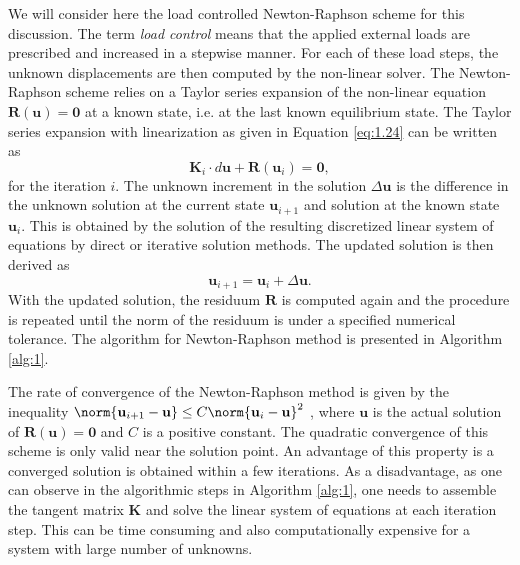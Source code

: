 \documentclass[11pt,a4paper,final]{article}
\begin{document}
We will consider here the load controlled Newton-Raphson scheme for this discussion. The term \textit{load control} means that the applied external loads are prescribed and increased in a stepwise manner. For each of these load steps, the unknown displacements are then computed by the non-linear solver. The Newton-Raphson scheme relies on a Taylor series expansion of the non-linear equation $\mathbf{R} (\mathbf{u}) = \bm{0}$ at a known state, i.e. at the last known equilibrium state. The Taylor series expansion with linearization as given in Equation \eqref{eq:1.24} can be written as 
\begin{equation}
\mathbf{K}_i \cdot d\mathbf{u} + \mathbf{R}(\mathbf{u}_i) = \bm{0},
\end{equation}
for the iteration $i$. The unknown increment in the solution $\Delta\mathbf{u}$ is the difference in the unknown solution at the current state $\mathbf{u}_{i+1}$ and solution at the known state $\mathbf{u}_i$. This is obtained by the solution of the resulting discretized linear system of equations by direct or iterative solution methods. The updated solution is then derived as 
\begin{equation}
\mathbf{u}_{i+1} = \mathbf{u}_i + \Delta\mathbf{u}.
\end{equation}
With the updated solution, the residuum $\mathbf{R}$ is computed again and the procedure is repeated until the norm of the residuum is under a specified numerical tolerance. The algorithm for Newton-Raphson method is presented in Algorithm \eqref{alg:1}. \par 

The rate of convergence of the Newton-Raphson method is given by the inequality $\norm{\mathbf{u}_{i+1} - \mathbf{u}} \leq C \norm{\mathbf{u}_i - \mathbf{u}}^2$ \cite{Wriggers2008}, where $\mathbf{u}$ is the actual solution of $\mathbf{R}(\mathbf{u}) = \mathbf{0}$ and $C$ is a positive constant. The quadratic convergence of this scheme is only valid near the solution point. An advantage of this property is a converged solution is obtained within a few iterations. As a disadvantage, as one can observe in the algorithmic steps in Algorithm \eqref{alg:1}, one needs to assemble the tangent matrix $\mathbf{K}$ and solve the linear system of equations at each iteration step. This can be time consuming and also computationally expensive for a system with large number of unknowns. \par 
\end{document}

